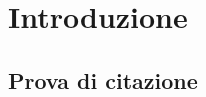 \chapter*{Introduzione} 

\label{chap:intro}

\section*{Prova di citazione}
\cite{BagnoliModeling2020}

